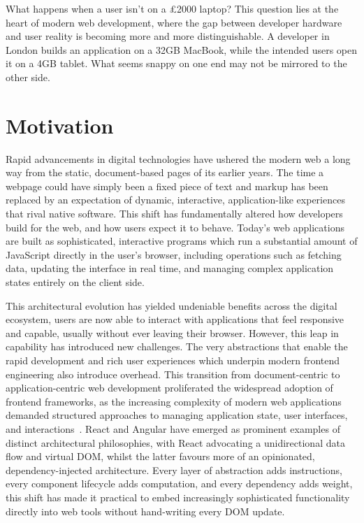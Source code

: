 \documentclass[11pt,a4paper]{report}
\begin{document}
What happens when a user isn't on a £2000 laptop? This question lies at the heart of modern web development, where the gap between developer hardware and user reality is becoming more and more distinguishable. A developer in London builds an application on a 32GB MacBook, while the intended users open it on a 4GB tablet. What seems snappy on one end may not be mirrored to the other side. 

\section{Motivation}

Rapid advancements in digital technologies have ushered the modern web a long way from the static, document-based pages of its earlier years. The time a webpage could have simply been a fixed piece of text and markup has been replaced by an expectation of dynamic, interactive, application-like experiences that rival native software. This shift has fundamentally altered how developers build for the web, and how users expect it to behave. Today's web applications are built as sophisticated, interactive programs which run a substantial amount of JavaScript directly in the user's browser, including operations such as
fetching data, updating the interface in real time, and managing complex application states entirely on the client side. 

\vspace{5mm}

This architectural evolution has yielded undeniable benefits across the digital ecosystem, users are now able to interact with applications that feel responsive and capable, usually without ever leaving their browser. However, this leap in capability has introduced new challenges. The very abstractions that enable the rapid development and rich user experiences which underpin modern frontend engineering also introduce overhead. This transition from document-centric to application-centric web development proliferated the widespread adoption of frontend frameworks, as the increasing complexity of modern web applications demanded
structured approaches to managing application state, user interfaces, and interactions~\cite{johnson1997}. React and Angular have emerged as prominent examples of distinct architectural philosophies, with React advocating a unidirectional data flow and virtual DOM, whilst the latter favours more of an opinionated, dependency-injected architecture. Every layer of abstraction adds instructions, every component lifecycle adds computation, and every dependency adds weight, this shift has made it practical to embed increasingly sophisticated functionality directly into web tools without hand-writing every DOM update. 
\end{document}
